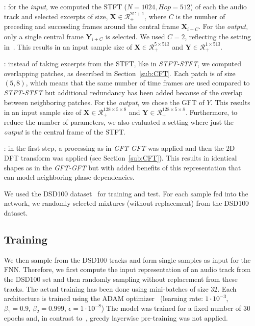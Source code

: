 \begin{description}[style=unboxed,leftmargin=0cm]
\item[STFT-STFT]: for the \emph{input}, we computed the \acs{STFT} (\(N=1024, Hop=512\)) of each the audio track and selected excerpts of size, \(\mathbf{X} \in \mathcal{R}^{2C + 1}_{+} \), where \(C\) is the number of preceding and succeeding frames around the central frame \(\mathbf{X}_{i+C}\). For the \emph{output}, only a single central frame \(\mathbf{Y}_{i+C}\) is selected.
We used \(C=2\), reflecting the setting in~\cite{uhlich15}. This results in an input sample size of \(\mathbf{X} \in \mathcal{R}_{+}^{5 \times 513}\) and  \(\mathbf{Y} \in \mathcal{R}_{+}^{1 \times 513}\).

\item[GFT-GFT/GFT-STFT]: instead of taking excerpts from the \acs{STFT}, like in \emph{STFT-STFT}, we computed overlapping patches, as described in Section~\ref{sub:CFT}. Each patch is of size \((5, 8)\), which means that the same number of time frames are used compared to \emph{STFT-STFT} but additional redundancy has been added because of the overlap between neighboring patches.
For the \emph{output}, we chose the GFT of \(Y\).
This results in an input sample size of \(\mathbf{X} \in \mathcal{R}_{+}^{128 \times 5 \times 8}\) and  \(\mathbf{Y} \in \mathcal{R}_{+}^{128 \times 5 \times 8}\).
Furthermore, to reduce the number of parameters, we also evaluated a setting where just the \emph{output} is the central frame of the STFT.

\item[CFT-CFT/CFT-STFT]: in the first step, a processing as in \emph{GFT-GFT} was applied and then the 2D-DFT transform was applied (see Section~\ref{sub:CFT}).
This results in identical shapes as in the \emph{GFT-GFT} but with added benefits of this representation that can model neighboring phase dependencies.
\end{description}

We used the DSD100 dataset~\cite{ono15} for training and test. 
For each sample fed into the network, we randomly selected mixtures (without replacement) from the DSD100 dataset.

\subsection{Training}
We then sample from the DSD100 tracks and form single samples as input for the \acs{FNN}.
Therefore, we first compute the input representation of an audio track from the DSD100 set and then randomly sampling without replacement from these tracks.
The actual training has been done using mini-batches of size 32.
Each architecture is trained using the ADAM optimizer~\cite{kingma14} (learning rate: \(1 \cdot 10^{-3}\), \(\beta_1=0.9\), \(\beta_2=0.999\), \(\epsilon=1 \cdot 10^{-8}\))
The model was trained for a fixed number of 30 epochs and, in contrast to~\cite{uhlich15}, greedy layerwise pre-training was not applied.

